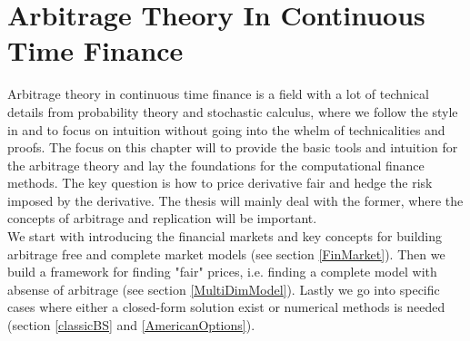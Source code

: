 
\chapter{Arbitrage Theory In Continuous Time Finance} %

\label{Chapter2} %

Arbitrage theory in continuous time finance is a field with a lot of technical details from probability theory and stochastic calculus, where we follow the style in \parencite{Hull} and \parencite{finKont} to focus on intuition without going into the whelm of technicalities and proofs. The focus on this chapter will to provide the basic tools and intuition for the arbitrage theory and lay the foundations for the computational finance methods. The key question is how to price derivative fair and hedge the risk imposed by the derivative. The thesis will mainly deal with the former, where the concepts of arbitrage and replication will be important.\\

We start with introducing the financial markets and key concepts for building arbitrage free and complete market models (see section \ref{FinMarket}). Then we build a framework for finding "fair" prices, i.e. finding a complete model with absense of arbitrage (see section \ref{MultiDimModel}). Lastly we go into specific cases where either a closed-form solution exist or numerical methods is needed (section \ref{classicBS} and \ref{AmericanOptions}).



